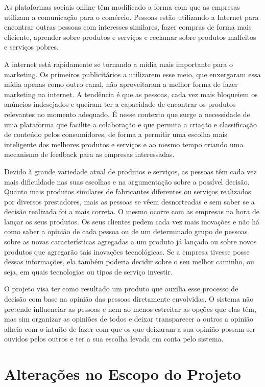  As plataformas sociais online têm modificado a forma com que as empresas utilizam a comunicação para o comércio. Pessoas estão utilizando a Internet para encontrar outras pessoas com interesses similares, fazer compras de forma mais eficiente, aprender sobre produtos e serviços e reclamar sobre produtos malfeitos e serviços pobres\cite{marketing_social_web}.

 A internet está rapidamente se tornando a mídia mais importante para o marketing. Os primeiros publicitários a utilizarem esse meio, que enxergaram essa mídia apenas como outro canal, não aproveitaram a melhor forma de fazer marketing na internet. A tendência é que as pessoas, cada vez mais bloqueiem os anúncios indesejados e queiram ter a capacidade de encontrar os produtos relevantes no momento adequado. É nesse contexto que surge a necessidade de uma plataforma que facilite a colaboração e que permita a criação e classificação de conteúdo pelos consumidores, de forma a permitir uma escolha mais inteligente dos melhores produtos e serviços e ao mesmo tempo criando uma mecanismo de feedback para as empresas interessadas.

 Devido à grande variedade atual de produtos e serviços, as pessoas têm cada vez mais dificuldade nas suas escolhas e na argumentação sobre a possível decisão. Quanto mais produtos similares de fabricantes diferentes ou serviços realizados por diversos prestadores, mais as pessoas se vêem desnorteadas e sem saber se a decisão realizada foi a mais correta. O mesmo ocorre com as empresas na hora de lançar os seus produtos. Os seus clientes pedem cada vez mais inovações e não há como saber a opinião de cada pessoa ou de um determinado grupo de pessoas sobre as novas características agregadas a um produto já lançado ou sobre novos produtos que agregarão tais inovações tecnológicas. Se a empresa tivesse posse dessas informações, ela também poderia decidir sobre o seu melhor caminho, ou seja, em quais tecnologias ou tipos de serviço investir.

 O projeto visa ter como resultado um produto que auxilia esse processo de decisão com base na opinião das pessoas diretamente envolvidas. O sistema não pretende influenciar as pessoas e nem ao menos estreitar as opções que elas têm, mas sim organizar as opiniões de todos e deixar transparecer a outros a opinião alheia com o intuito de fazer com que os que deixaram a sua opinião possam ser ouvidos pelos outros e ter a sua escolha levada em conta pelo sistema.

\section{Alterações no Escopo do Projeto}

